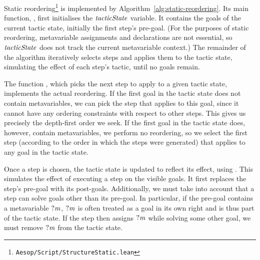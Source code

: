 Static reordering\footnote{\texttt{Aesop/Script/StructureStatic.lean}} is implemented by Algorithm~\ref{alg:static-reordering}.
Its main function, , first initialises the ${\operatorname{\mathit{tacticState}}}$ variable.
It contains the goals of the current tactic state, initially the first step's pre-goal.
(For the purposes of static reordering, metavariable assignments and declarations are not essential, so ${\operatorname{\mathit{tacticState}}}$ does not track the current metavariable context.)
The remainder of the algorithm iteratively selects steps and applies them to the tactic state, simulating the effect of each step's tactic, until no goals remain.

The function , which picks the next step to apply to a given tactic state, implements the actual reordering.
If the first goal in the tactic state does not contain metavariables, we can pick the step that applies to this goal, since it cannot have any ordering constraints with respect to other steps.
This gives us precisely the depth-first order we seek.
If the first goal in the tactic state does, however, contain metavariables, we perform no reordering, so we select the first step (according to the order in which the steps were generated) that applies to any goal in the tactic state.

Once a step is chosen, the tactic state is updated to reflect its effect, using .
This simulates the effect of executing a step on the visible goals.
It first replaces the step's pre-goal with its post-goals.
Additionally, we must take into account that a step can solve goals other than its pre-goal.
In particular, if the pre-goal contains a metavariable $\mathit{?m}$, $\mathit{?m}$ is often treated as a goal in its own right and is thus part of the tactic state.
If the step then assigns $\mathit{?m}$ while solving some other goal, we must remove $\mathit{?m}$ from the tactic state.

